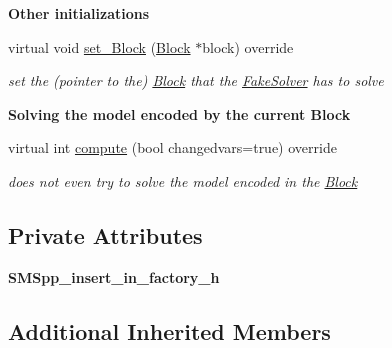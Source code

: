 \begin{Indent}\textbf{ Other initializations}\par
\begin{DoxyCompactItemize}
\item 
virtual void \mbox{\hyperlink{class_s_m_spp__di__unipi__it_1_1_fake_solver_a8d7fb698416759f38941e06b23cccaec}{set\+\_\+\+Block}} (\mbox{\hyperlink{class_s_m_spp__di__unipi__it_1_1_block}{Block}} $\ast$block) override
\begin{DoxyCompactList}\small\item\em set the (pointer to the) \mbox{\hyperlink{class_s_m_spp__di__unipi__it_1_1_block}{Block}} that the \mbox{\hyperlink{class_s_m_spp__di__unipi__it_1_1_fake_solver}{Fake\+Solver}} has to solve \end{DoxyCompactList}\end{DoxyCompactItemize}
\end{Indent}
\begin{Indent}\textbf{ Solving the model encoded by the current Block}\par
\begin{DoxyCompactItemize}
\item 
virtual int \mbox{\hyperlink{class_s_m_spp__di__unipi__it_1_1_fake_solver_afc8ff54ab05d22f4cca0fb0bfbeb7a49}{compute}} (bool changedvars=true) override
\begin{DoxyCompactList}\small\item\em does not even try to solve the model encoded in the \mbox{\hyperlink{class_s_m_spp__di__unipi__it_1_1_block}{Block}} \end{DoxyCompactList}\end{DoxyCompactItemize}
\end{Indent}
\subsection*{Private Attributes}
\begin{DoxyCompactItemize}
\item 
\mbox{\label{class_s_m_spp__di__unipi__it_1_1_fake_solver_a5618a1c2a09ff7cd62e4de9df7956672}} 
{\bfseries S\+M\+Spp\+\_\+insert\+\_\+in\+\_\+factory\+\_\+h}
\end{DoxyCompactItemize}
\subsection*{Additional Inherited Members}


